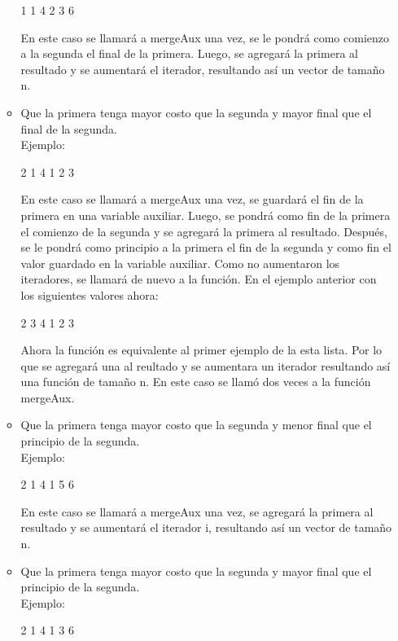 \begin{itemize}
\begin{itemize}
\begin{codesnippet}
1 1 4
2 3 6
\end{codesnippet}

En este caso se llamará a mergeAux una vez, se le pondrá como comienzo a la segunda el final de la primera. Luego, se agregará la primera al resultado y se aumentará el iterador, resultando así un vector de tamaño n.

\item Que la primera tenga mayor costo que la segunda y mayor final que el final de la segunda.\\
Ejemplo:

\begin{codesnippet}
2 1 4
1 2 3
\end{codesnippet}

En este caso se llamará a mergeAux una vez, se guardará el fin de la primera en una variable auxiliar. Luego, se pondrá como fin de la primera el comienzo de la segunda y se agregará la primera al resultado. Después, se le pondrá como principio a la primera el fin de la segunda y como fin el valor guardado en la variable auxiliar. Como no aumentaron los iteradores, se llamará de nuevo a la función. En el ejemplo anterior con los siguientes valores ahora:

\begin{codesnippet}
2 3 4
1 2 3
\end{codesnippet}

Ahora la función es equivalente al primer ejemplo de la esta lista. Por lo que se agregará una al reultado y se aumentara un iterador resultando así una función de tamaño n.
En este caso se llamó dos veces a la función mergeAux.

\item Que la primera tenga mayor costo que la segunda y menor final que el principio de la segunda.\\
Ejemplo:

\begin{codesnippet}
2 1 4
1 5 6
\end{codesnippet}

En este caso se llamará a mergeAux una vez, se agregará la primera al resultado y se aumentará el iterador i, resultando así un vector de tamaño n.

\item Que la primera tenga mayor costo que la segunda y mayor final que el principio de la segunda.\\
Ejemplo:

\begin{codesnippet}
2 1 4
1 3 6
\end{codesnippet}


\end{itemize}
\end{itemize}
